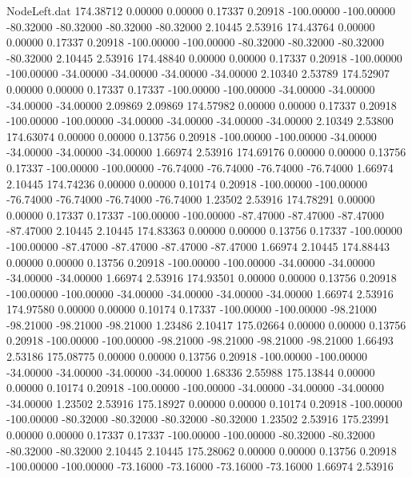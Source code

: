 \begin{filecontents}{NodeLeft.dat}
 174.38712    0.00000    0.00000     0.17337    0.20918 -100.00000 -100.00000  -80.32000  -80.32000  -80.32000  -80.32000    2.10445    2.53916
 174.43764    0.00000    0.00000     0.17337    0.20918 -100.00000 -100.00000  -80.32000  -80.32000  -80.32000  -80.32000    2.10445    2.53916
 174.48840    0.00000    0.00000     0.17337    0.20918 -100.00000 -100.00000  -34.00000  -34.00000  -34.00000  -34.00000    2.10340    2.53789
 174.52907    0.00000    0.00000     0.17337    0.17337 -100.00000 -100.00000  -34.00000  -34.00000  -34.00000  -34.00000    2.09869    2.09869
 174.57982    0.00000    0.00000     0.17337    0.20918 -100.00000 -100.00000  -34.00000  -34.00000  -34.00000  -34.00000    2.10349    2.53800
 174.63074    0.00000    0.00000     0.13756    0.20918 -100.00000 -100.00000  -34.00000  -34.00000  -34.00000  -34.00000    1.66974    2.53916
 174.69176    0.00000    0.00000     0.13756    0.17337 -100.00000 -100.00000  -76.74000  -76.74000  -76.74000  -76.74000    1.66974    2.10445
 174.74236    0.00000    0.00000     0.10174    0.20918 -100.00000 -100.00000  -76.74000  -76.74000  -76.74000  -76.74000    1.23502    2.53916
 174.78291    0.00000    0.00000     0.17337    0.17337 -100.00000 -100.00000  -87.47000  -87.47000  -87.47000  -87.47000    2.10445    2.10445
 174.83363    0.00000    0.00000     0.13756    0.17337 -100.00000 -100.00000  -87.47000  -87.47000  -87.47000  -87.47000    1.66974    2.10445
 174.88443    0.00000    0.00000     0.13756    0.20918 -100.00000 -100.00000  -34.00000  -34.00000  -34.00000  -34.00000    1.66974    2.53916
 174.93501    0.00000    0.00000     0.13756    0.20918 -100.00000 -100.00000  -34.00000  -34.00000  -34.00000  -34.00000    1.66974    2.53916
 174.97580    0.00000    0.00000     0.10174    0.17337 -100.00000 -100.00000  -98.21000  -98.21000  -98.21000  -98.21000    1.23486    2.10417
 175.02664    0.00000    0.00000     0.13756    0.20918 -100.00000 -100.00000  -98.21000  -98.21000  -98.21000  -98.21000    1.66493    2.53186
 175.08775    0.00000    0.00000     0.13756    0.20918 -100.00000 -100.00000  -34.00000  -34.00000  -34.00000  -34.00000    1.68336    2.55988
 175.13844    0.00000    0.00000     0.10174    0.20918 -100.00000 -100.00000  -34.00000  -34.00000  -34.00000  -34.00000    1.23502    2.53916
 175.18927    0.00000    0.00000     0.10174    0.20918 -100.00000 -100.00000  -80.32000  -80.32000  -80.32000  -80.32000    1.23502    2.53916
 175.23991    0.00000    0.00000     0.17337    0.17337 -100.00000 -100.00000  -80.32000  -80.32000  -80.32000  -80.32000    2.10445    2.10445
 175.28062    0.00000    0.00000     0.13756    0.20918 -100.00000 -100.00000  -73.16000  -73.16000  -73.16000  -73.16000    1.66974    2.53916

\end{filecontents}
